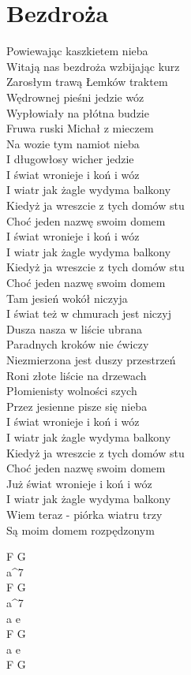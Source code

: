 \section{Bezdroża}
\begin{minipage}[t]{\dimexpr.4\textwidth-.4\columnsep}
    Powiewając kaszkietem nieba\\
    Witają nas bezdroża wzbijając kurz\\
    Zarosłym trawą Łemków traktem\\
    Wędrownej pieśni jedzie wóz\\
    \hfill\break
    Wypłowiały na płótna budzie\\
    Fruwa ruski Michał z mieczem\\
    Na wozie tym namiot nieba\\
    I długowłosy wicher jedzie\\
    \hfill\break
    \vin I świat wronieje i koń i wóz\\
    \vin I wiatr jak żagle wydyma balkony\\
    \vin Kiedyż ja wreszcie z tych domów stu\\
    \vin Choć jeden nazwę swoim domem\\
    \hfill\break
    \vin I świat wronieje i koń i wóz\\
    \vin I wiatr jak żagle wydyma balkony\\
    \vin Kiedyż ja wreszcie z tych domów stu\\
    \vin Choć jeden nazwę swoim domem\\
    \hfill\break
    Tam jesień wokół niczyja\\
    I świat też w chmurach jest niczyj\\
    Dusza nasza w liście ubrana\\
    Paradnych kroków nie ćwiczy\\
    \hfill\break
    Niezmierzona jest duszy przestrzeń\\
    Roni złote liście na drzewach\\
    Płomienisty wolności szych\\
    Przez jesienne pisze się nieba\\
    \hfill\break
    \vin I świat wronieje i koń i wóz\\
    \vin I wiatr jak żagle wydyma balkony\\
    \vin Kiedyż ja wreszcie z tych domów stu\\
    \vin Choć jeden nazwę swoim domem\\
    \hfill\break
    \vin Już świat wronieje i koń i wóz\\
    \vin I wiatr jak żagle wydyma balkony\\
    \vin Wiem teraz - piórka wiatru trzy\\
    \vin Są moim domem rozpędzonym\\
\end{minipage}
\hfill
\begin{minipage}[t]{\dimexpr.05\textwidth-.05\columnsep}
    \ifchorded
    F G\\
    a^7\\
    F G\\
    a^7\\
    \hfill\break
    a e\\
    F G\\
    a e\\
    F G\\
    \else
    \fi
\end{minipage}